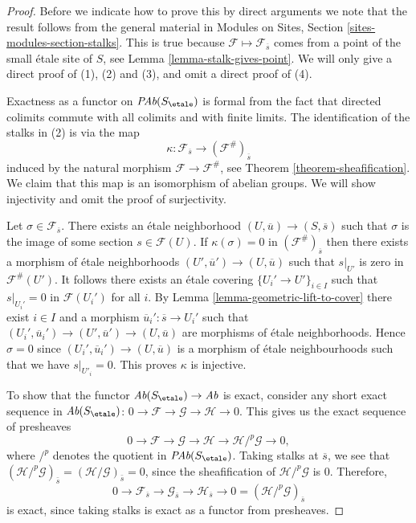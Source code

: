 \begin{proof}
Before we indicate how to prove this by direct arguments
we note that the result follows from the general material in
Modules on Sites, Section \ref{sites-modules-section-stalks}.
This is true because $\mathcal{F} \mapsto \mathcal{F}_{\overline{s}}$
comes from a point of the small \'etale site of $S$, see
Lemma \ref{lemma-stalk-gives-point}.
We will only give a direct proof of (1), (2) and (3), and omit
a direct proof of (4).

\medskip\noindent
Exactness as a functor on $\textit{PAb}(S_\etale)$ is formal from the
fact that directed colimits commute with all colimits and with finite
limits. The identification of the stalks in (2) is via the map
$$
\kappa :
\mathcal{F}_{\overline{s}}
\longrightarrow
(\mathcal{F}^\#)_{\overline{s}}
$$
induced by the natural morphism $\mathcal{F}\to \mathcal{F}^\#$, see
Theorem \ref{theorem-sheafification}.
We claim that this map is an isomorphism of abelian groups. We will show
injectivity and omit the proof of surjectivity.

\medskip\noindent
Let $\sigma\in \mathcal{F}_{\overline{s}}$.
There exists an \'etale neighborhood
$(U, \overline{u})\to (S, \overline{s})$ such that $\sigma$ is the image of some
section $s \in \mathcal{F}(U)$. If $\kappa(\sigma) = 0$ in
$(\mathcal{F}^\#)_{\overline{s}}$ then there exists a morphism of \'etale
neighborhoods $(U', \overline{u}')\to (U, \overline{u})$ such that
$s|_{U'}$ is zero in $\mathcal{F}^\#(U')$. It follows there
exists an \'etale covering
$\{U_i'\to U'\}_{i\in I}$ such that $s|_{U_i'}=0$ in
$\mathcal{F}(U_i')$ for all $i$. By Lemma \ref{lemma-geometric-lift-to-cover}
there exist $i \in I$ and a morphism
$\overline{u}_i': \overline{s} \to U_i'$ such that
$(U_i', \overline{u}_i') \to (U', \overline{u}')\to (U, \overline{u})$
are morphisms of \'etale neighborhoods. Hence $\sigma = 0$
since $(U_i', \overline{u}_i') \to (U, \overline{u})$
is a morphism of \'etale neighbourhoods such that
we have $s|_{U'_i}=0$. This proves $\kappa$ is injective.

\medskip\noindent
To show that the functor $\textit{Ab}(S_\etale) \to \textit{Ab}$ is
exact, consider any short exact sequence in $\textit{Ab}(S_\etale)$:
$
0\to \mathcal{F}\to \mathcal{G}\to \mathcal H \to 0.
$
This gives us the exact sequence of presheaves
$$
0 \to \mathcal{F} \to \mathcal{G} \to \mathcal H \to
\mathcal H/^p\mathcal{G} \to 0,
$$
where $/^p$ denotes the quotient in $\textit{PAb}(S_\etale)$.
Taking stalks at
$\overline{s}$, we see that $(\mathcal H /^p\mathcal{G})_{\bar{s}} =
(\mathcal H /\mathcal{G})_{\bar{s}} = 0$, since the sheafification of
$\mathcal H/^p\mathcal{G}$ is $0$.
Therefore,
$$
0\to \mathcal{F}_{\overline{s}} \to \mathcal{G}_{\overline{s}} \to
\mathcal{H}_{\overline{s}} \to 0 = (\mathcal H/^p\mathcal{G})_{\overline{s}}
$$
is exact, since taking stalks is exact as a functor from presheaves.
\end{proof}

